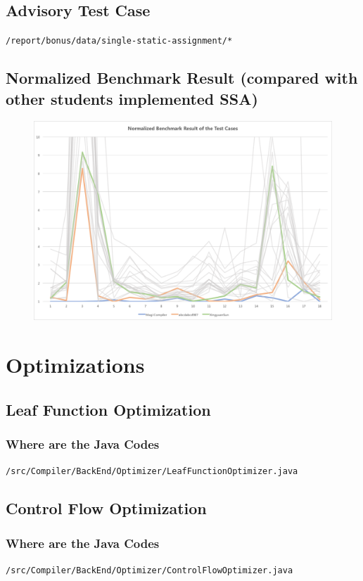\documentclass[a4paper]{article}
\begin{document}
\subsection{Advisory Test Case}
\noindent
\texttt{/report/bonus/data/single-static-assignment/*}
\subsection{Normalized Benchmark Result (compared with other students implemented SSA)}
\begin{figure}[!htp]
	\includegraphics[width=\textwidth]{../presentation/image/benchmark/single-static-assignment}
\end{figure}

\section{Optimizations}
\subsection{Leaf Function Optimization}
\subsubsection{Where are the Java Codes}
\noindent
\texttt{/src/Compiler/BackEnd/Optimizer/LeafFunctionOptimizer.java}

\subsection{Control Flow Optimization}
\subsubsection{Where are the Java Codes}
\noindent
\texttt{/src/Compiler/BackEnd/Optimizer/ControlFlowOptimizer.java}
\end{document}
